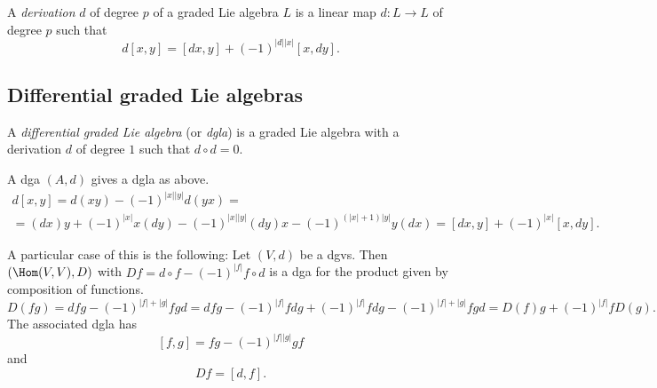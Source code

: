 \documentclass[english,no-theorem-numbers]{short-notes}
\newcommand\degree[1]{|#1|}
\newenvironment{verification}{\footnotesize\color{gray}}{}
\begin{document}
A \emph{derivation} $d$ of degree $p$ of a graded Lie algebra $L$ is a linear map $d\colon L → L$ of degree $p$ such that
\[
d[x,y] = [dx, y] + (-1)^{\degree d \degree x} [x,dy].
\]

\subsection{Differential graded Lie algebras}

A \emph{differential graded Lie algebra} (or \emph{dgla}) is a graded Lie algebra with a derivation $d$ of degree $1$ such that $d∘d = 0$.

\begin{Ex}
    A dga $(A,d)$ gives a dgla as above.%
    \begin{verification}%
        \begin{multline*}
        d[x,y] =
        d(xy) - (-1)^{\degree x \degree y} d(yx) = \\ =
        (dx)y + (-1)^{\degree x}x(dy) - (-1)^{\degree x \degree y}(dy)x - (-1)^{(\degree x + 1)\degree y}y(dx) =
        [dx,y] + (-1)^{\degree x}[x, dy].
    \end{multline*}%
    \end{verification}%
\end{Ex}
\begin{Ex}
    A particular case of this is the following:
    Let $(V,d)$ be a dgvs.
    Then $(\Hom(V,V),D)$ with $Df = d∘f - (-1)^{\degree f} f ∘ d$ is a dga for the product given by composition of functions.%
    \begin{verification}%
    \[
        D(fg) = 
        dfg - (-1)^{\degree f + \degree g}fgd =
        dfg - (-1)^{\degree f}fdg + (-1)^{\degree f}fdg - (-1)^{\degree f + \degree g}fgd =
        D(f)g + (-1)^{\degree f}fD(g).
    \]%
    \end{verification}%
    The associated dgla has
    \[
    [f,g] = fg - (-1)^{\degree f \degree g} gf
    \]
    and 
    \[
    Df = [d,f].
    \]
\end{Ex}
\end{document}
